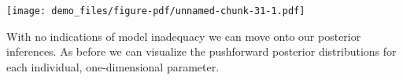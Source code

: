 \documentclass[
  letterpaper,
  DIV=11,
  numbers=noendperiod]{scrartcl}
\newenvironment{Shaded}{\begin{snugshade}}{\end{snugshade}}
\newcommand{\AttributeTok}[1]{\textcolor[rgb]{0.40,0.45,0.13}{#1}}
\newcommand{\ConstantTok}[1]{\textcolor[rgb]{0.56,0.35,0.01}{#1}}
\newcommand{\DecValTok}[1]{\textcolor[rgb]{0.68,0.00,0.00}{#1}}
\newcommand{\FunctionTok}[1]{\textcolor[rgb]{0.28,0.35,0.67}{#1}}
\newcommand{\NormalTok}[1]{\textcolor[rgb]{0.00,0.23,0.31}{#1}}
\newcommand{\SpecialCharTok}[1]{\textcolor[rgb]{0.37,0.37,0.37}{#1}}
\newcommand{\StringTok}[1]{\textcolor[rgb]{0.13,0.47,0.30}{#1}}
\begin{document}
\begin{Shaded}
\end{Shaded}

\texttt{[image: demo\_files/figure-pdf/unnamed-chunk-31-1.pdf]}

With no indications of model inadequacy we can move onto our posterior
inferences. As before we can visualize the pushforward posterior
distributions for each individual, one-dimensional parameter.
\end{document}
